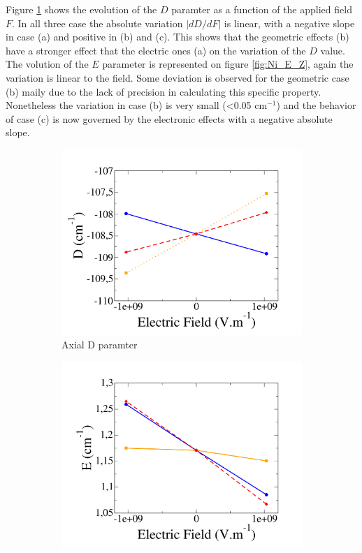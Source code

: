 \documentclass[10pt]{report}
\numberwithin{equation}{section}
\begin{document}
Figure \ref{fig:Ni_D_Z} shows the evolution of the $D$ paramter as a function of the applied field $F$.
In all three case the absolute variation $|dD/dF|$ is linear, with a negative slope in case (a) and positive in (b) and (c).
This shows that the geometric effects (b) have a stronger effect that the electric ones (a) on the variation of the $D$ value.
The volution of the $E$ parameter is represented on figure \ref{fig:Ni_E_Z}, again the variation is linear to the field.
Some deviation is observed for the geometric case (b) maily due to the lack of precision in calculating this specific property.
Nonetheless the variation in case (b) is very small (<0.05 cm$^{-1}$) and the behavior of case (c) is now governed by the electronic effects with a negative absolute slope.

\begin{figure}[!h]
    \centering
    \begin{subfigure}{.5\textwidth}
      \centering
      \includegraphics[width=\linewidth]{Images/D_E_Z.png}
      \caption{Axial D paramter}
      \label{fig:Ni_D_Z}
    \end{subfigure}%
    \begin{subfigure}{.5\textwidth}
      \centering
      \includegraphics[width=\linewidth]{Images/E_E_Z.png}

\end{subfigure}
\end{figure}
\end{document}
